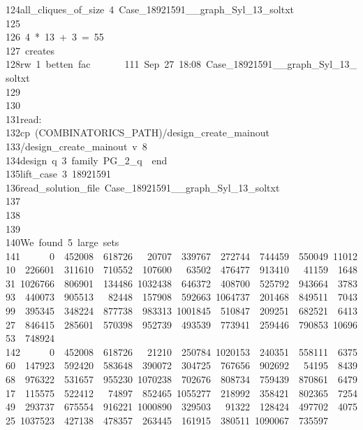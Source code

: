 \begin{tabbing}
124\>\>\>all\_cliques\_of\_size\ 4\ Case\_18921591\_\_graph\_Syl\_13\_soltxt\ \\[0pt]
125\>\\[0pt]
126\>\ 4\ *\ 13\ +\ 3\ =\ 55\\[0pt]
127\>\ creates\\[0pt]
128\>rw\ 1\ betten\ fac\ \ \ \ \ \ \ 111\ Sep\ 27\ 18:08\ Case\_18921591\_\_graph\_Syl\_13\_soltxt\\[0pt]
129\>\\[0pt]
130\>\\[0pt]
131\>read:\\[0pt]
132\>\>cp\ (COMBINATORICS\_PATH)/design\_create\_mainout\ \\[0pt]
133\>\>/design\_create\_mainout\ v\ 8\ \ \\[0pt]
134\>\>\>design\ q\ 3\ family\ PG\_2\_q\ \ end\ \\[0pt]
135\>\>\>lift\_case\ 3\ 18921591\ \\[0pt]
136\>\>\>read\_solution\_file\ Case\_18921591\_\_graph\_Syl\_13\_soltxt\\[0pt]
137\>\\[0pt]
138\>\\[0pt]
139\>\\[0pt]
140\>We\ found\ 5\ large\ sets\\[0pt]
141\>\ \ \ \ \ \ 0\ \ 452008\ \ 618726\ \ \ 20707\ \ 339767\ \ 272744\ \ 744459\ \ 550049\ 1101210\ \ 226601\ \ 311610\ \ 710552\ \ 107600\ \ \ 63502\ \ 476477\ \ 913410\ \ \ 41159\ \ 164831\ 1026766\ \ 806901\ \ 134486\ 1032438\ \ 646372\ \ 408700\ \ 525792\ \ 943664\ \ 378393\ \ 440073\ \ 905513\ \ \ 82448\ \ 157908\ \ 592663\ 1064737\ \ 201468\ \ 849511\ \ 704399\ \ 395345\ \ 348224\ \ 877738\ \ 983313\ 1001845\ \ 510847\ \ 209251\ \ 682521\ \ 641327\ \ 846415\ \ 285601\ \ 570398\ \ 952739\ \ 493539\ \ 773941\ \ 259446\ \ 790853\ 
1069653\ \ 748924\\[0pt]
142\>\ \ \ \ \ \ 0\ \ 452008\ \ 618726\ \ \ 21210\ \ 250784\ 1020153\ \ 240351\ \ 558111\ \ 637560\ \ 147923\ \ 592420\ \ 583648\ \ 390072\ \ 304725\ \ 767656\ \ 902692\ \ \ 54195\ \ 843968\ \ 976322\ \ 531657\ \ 955230\ 1070238\ \ 702676\ \ 808734\ \ 759439\ \ 870861\ \ 647917\ \ 115575\ \ 522412\ \ \ 74897\ \ 852465\ 1055277\ \ 218992\ \ 358421\ \ 802365\ \ 725449\ \ 293737\ \ 675554\ \ 916221\ 1000890\ \ 329503\ \ \ 91322\ \ 128424\ \ 497702\ \ 407525\ 1037523\ \ 427138\ \ 478357\ \ 263445\ \ 161915\ \ 380511\ 1090067\ \ 735597\ \ 

\end{tabbing}
